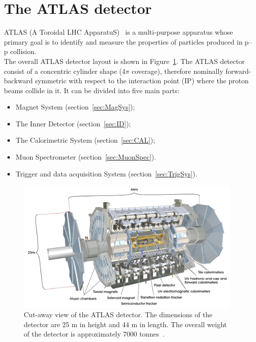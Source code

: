 \section{The ATLAS detector}
ATLAS (A Toroidal LHC ApparatuS)~\cite{ATLAS} is a multi-purpose apparatus whose primary goal is to identify and measure the properties of particles produced in p--p collision.\\
The overall ATLAS detector layout is shown in Figure~\ref{fig:ATLAS}.
The ATLAS detector consist of a concentric cylinder shape (4$\pi$ coverage), therefore nominally forward-backward symmetric with respect to the interaction point (IP) where the proton beams collide in it.
It can be divided into five main parts:
\begin{itemize}
	\item Magnet System (section~\ref{sec:MagSys});
	\item The Inner Detector  (section~\ref{sec:ID});
	\item The Calorimetric System  (section~\ref{sec:CAL});
	\item Muon Spectrometer  (section~\ref{sec:MuonSpec}).
	\item Trigger and data acquisition System  (section~\ref{sec:TrigSys}).
\end{itemize}
\begin{figure}[h]
	\centering
	\includegraphics[width=110mm]{Chapters/CH2/figures/ATLAS}
	\caption{Cut-away view of the ATLAS detector. The dimensions of the detector are 25 m in height and 44 m in length. The overall weight of the detector is approximately 7000 tonnes~\cite{ATLAS}.}
	\label{fig:ATLAS}
\end{figure}
\clearpage

